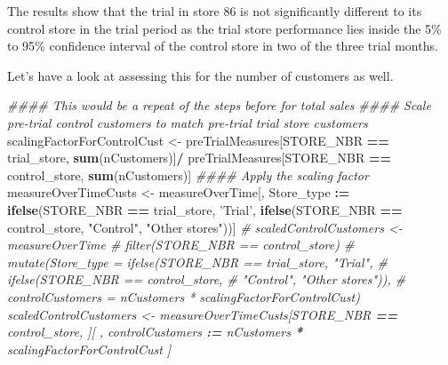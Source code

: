 \documentclass[]{article}
\newenvironment{Shaded}{\begin{snugshade}}{\end{snugshade}}
\newcommand{\CommentTok}[1]{\textcolor[rgb]{0.56,0.35,0.01}{\textit{#1}}}
\newcommand{\ErrorTok}[1]{\textcolor[rgb]{0.64,0.00,0.00}{\textbf{#1}}}
\newcommand{\KeywordTok}[1]{\textcolor[rgb]{0.13,0.29,0.53}{\textbf{#1}}}
\newcommand{\NormalTok}[1]{#1}
\newcommand{\OperatorTok}[1]{\textcolor[rgb]{0.81,0.36,0.00}{\textbf{#1}}}
\newcommand{\StringTok}[1]{\textcolor[rgb]{0.31,0.60,0.02}{#1}}
\begin{document}
The results show that the trial in store 86 is not significantly
different to its control store in the trial period as the trial store
performance lies inside the 5\% to 95\% confidence interval of the
control store in two of the three trial months.

Let's have a look at assessing this for the number of customers as well.

\begin{Shaded}
\begin{Highlighting}[]
\CommentTok{#### This would be a repeat of the steps before for total sales}
\CommentTok{#### Scale pre-trial control customers to match pre-trial trial store customers}
\NormalTok{scalingFactorForControlCust <-}\StringTok{ }\NormalTok{preTrialMeasures[STORE_NBR }\OperatorTok{==}\StringTok{ }\NormalTok{trial_store, }\KeywordTok{sum}\NormalTok{(nCustomers)]}\OperatorTok{/}
\StringTok{                               }\NormalTok{preTrialMeasures[STORE_NBR }\OperatorTok{==}\StringTok{ }\NormalTok{control_store, }\KeywordTok{sum}\NormalTok{(nCustomers)]}
\CommentTok{#### Apply the scaling factor}
\NormalTok{measureOverTimeCusts <-}\StringTok{ }\NormalTok{measureOverTime[, Store_type }\OperatorTok{:}\ErrorTok{=}\StringTok{ }\KeywordTok{ifelse}\NormalTok{(STORE_NBR }\OperatorTok{==}\StringTok{ }\NormalTok{trial_store, }\StringTok{'Trial'}\NormalTok{,}
                                                               \KeywordTok{ifelse}\NormalTok{(STORE_NBR }\OperatorTok{==}\StringTok{ }\NormalTok{control_store,}
                                                                      \StringTok{"Control"}\NormalTok{, }\StringTok{"Other stores"}\NormalTok{))]}
\CommentTok{# scaledControlCustomers <- measureOverTime %
\CommentTok{#   filter(STORE_NBR == control_store) %
\CommentTok{#   mutate(Store_type = ifelse(STORE_NBR == trial_store, "Trial",}
\CommentTok{#                              ifelse(STORE_NBR == control_store,}
\CommentTok{#                                     "Control", "Other stores")),}
\CommentTok{#          controlCustomers = nCustomers * scalingFactorForControlCust)}
\NormalTok{scaledControlCustomers <-}\StringTok{ }\NormalTok{measureOverTimeCusts[STORE_NBR }\OperatorTok{==}\StringTok{ }\NormalTok{control_store,}
\NormalTok{                                               ][ , controlCustomers }\OperatorTok{:}\ErrorTok{=}\StringTok{ }\NormalTok{nCustomers}
                                                  \OperatorTok{*}\StringTok{ }\NormalTok{scalingFactorForControlCust}
\NormalTok{                                                  ]}
}}
\end{Highlighting}
\end{Shaded}
\end{document}
